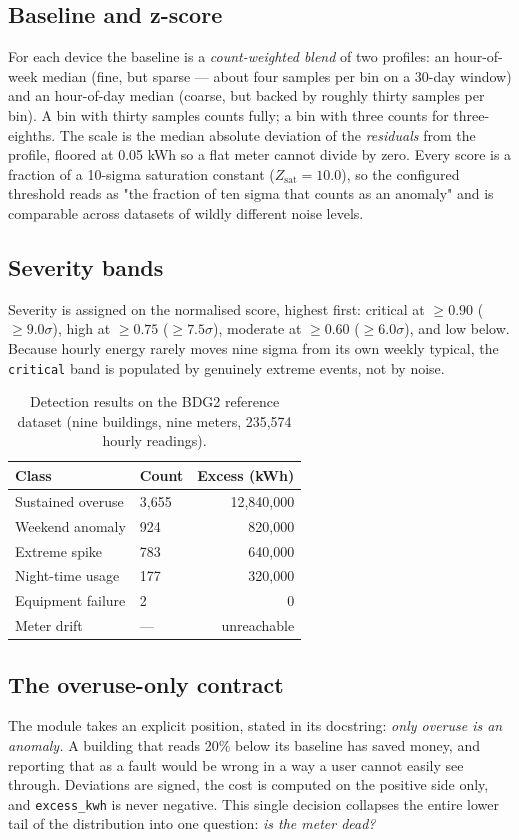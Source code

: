 \documentclass[conference, 10pt, a4paper]{IEEEtran}
\begin{document}
\subsection{Baseline and z-score}
For each device the baseline is a \emph{count-weighted blend} of two
profiles: an hour-of-week median (fine, but sparse — about four samples per
bin on a 30-day window) and an hour-of-day median (coarse, but backed by
roughly thirty samples per bin). A bin with thirty samples counts fully; a bin
with three counts for three-eighths. The scale is the median absolute deviation
of the \emph{residuals} from the profile, floored at 0.05 kWh so a flat meter
cannot divide by zero. Every score is a fraction of a 10-sigma saturation
constant ($Z_{\text{sat}} = 10.0$), so the configured threshold reads as
"the fraction of ten sigma that counts as an anomaly" and is comparable across
datasets of wildly different noise levels.

\subsection{Severity bands}
Severity is assigned on the normalised score, highest first:
critical at $\geq 0.90$ ($\geq 9.0\sigma$), high at $\geq 0.75$
($\geq 7.5\sigma$), moderate at $\geq 0.60$ ($\geq 6.0\sigma$), and low
below. Because hourly energy rarely moves nine sigma from its own weekly
typical, the \texttt{critical} band is populated by genuinely extreme events,
not by noise.

\begin{table}[h!]
\caption{Detection results on the BDG2 reference dataset (nine buildings, nine meters, 235,574 hourly readings).}
\centering
\begin{tabular}{@{}llr@{}}
\toprule
Class & Count & Excess (kWh) \\
\midrule
Sustained overuse   & 3,655 & 12,840,000 \\
Weekend anomaly     &   924 &    820,000 \\
Extreme spike       &   783 &    640,000 \\
Night-time usage    &   177 &    320,000 \\
Equipment failure   &     2 &           0 \\
Meter drift         &   --- & unreachable \\
\bottomrule
\end{tabular}
\label{tab:results}
\end{table}

\subsection{The overuse-only contract}
The module takes an explicit position, stated in its docstring: \emph{only
overuse is an anomaly.} A building that reads 20\% below its baseline has
saved money, and reporting that as a fault would be wrong in a way a user
cannot easily see through. Deviations are signed, the cost is computed on the
positive side only, and \texttt{excess\_kwh} is never negative. This single
decision collapses the entire lower tail of the distribution into one question:
\emph{is the meter dead?}
\end{document}
